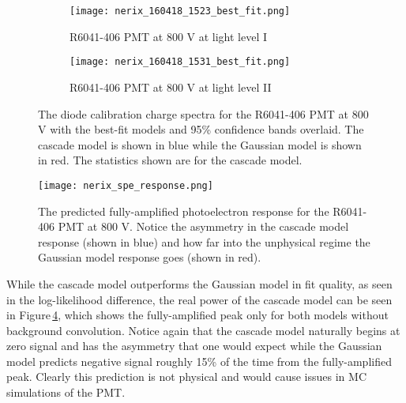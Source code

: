 \documentclass[11pt,a4paper]{article}
\newcommand\figref[1]{Figure\,\ref{#1}}
\begin{document}
\begin{figure}[t]
    \centering
    \begin{subfigure}[t]{0.49\textwidth}
        \centering
        \texttt{[image: nerix\_160418\_1523\_best\_fit.png]} 
        \caption{R6041-406 PMT at 800 V at light level I}
        \label{fig:1523_best}
    \end{subfigure}
    \hfill
    \begin{subfigure}[t]{0.49\textwidth}
        \centering
        \texttt{[image: nerix\_160418\_1531\_best\_fit.png]} 
        \caption{R6041-406 PMT at 800 V at light level II}
        \label{fig:1531_best}
    \end{subfigure}

    \caption{The diode calibration charge spectra for the R6041-406 PMT at 800 V with the best-fit models and 95\% confidence bands overlaid.  The cascade model is shown in blue while the Gaussian model is shown in red.  The statistics shown are for the cascade model.}
    
    \label{fig:nerix_best_fits}
\end{figure}



\begin{figure}[h]
\centering
\texttt{[image: nerix\_spe\_response.png]}
\caption{The predicted fully-amplified photoelectron response for the R6041-406 PMT at 800 V.  Notice the asymmetry in the cascade model response (shown in blue) and how far into the unphysical regime the Gaussian model response goes (shown in red). }
\label{fig:fig-nerix_spe}
\end{figure}

While the cascade model outperforms the Gaussian model in fit quality, as seen in the log-likelihood difference, the real power of the cascade model can be seen in \figref{fig:fig-nerix_spe}, which shows the fully-amplified peak only for both models without background convolution.  Notice again that the cascade model naturally begins at zero signal and has the asymmetry that one would expect while the Gaussian model predicts negative signal roughly 15\% of the time from the fully-amplified peak.  Clearly this prediction is not physical and would cause issues in MC simulations of the PMT.
\end{document}
